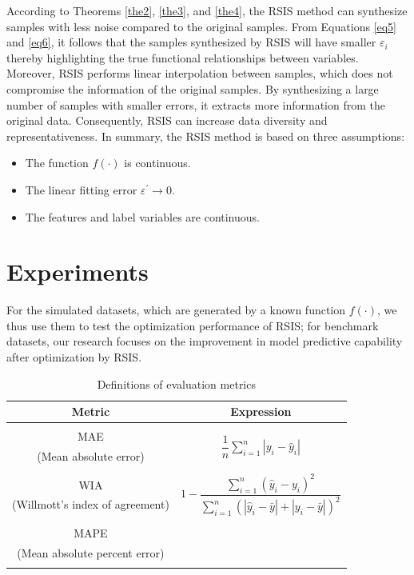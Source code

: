 \documentclass[final,3p,times]{elsarticle}
\begin{document}
{According to Theorems \ref{the2}, \ref{the3}, and \ref{the4}, the RSIS method can synthesize samples with less noise compared to the original samples. From Equations \eqref{eq5} and \eqref{eq6}, it follows that the samples synthesized by RSIS will have smaller $\varepsilon_i$ thereby highlighting the true functional relationships between variables. Moreover, RSIS performs linear interpolation between samples, which does not compromise the information of the original samples. By synthesizing a large number of samples with smaller errors, it extracts more information from the original data. Consequently, RSIS can increase data diversity and representativeness.}
In summary, the RSIS method is based on three assumptions:


\begin{itemize}
  \item The function $f(\cdot)$ is continuous.
  \item The linear fitting error $\varepsilon^\prime\rightarrow0$.
  \item The features and label variables are continuous.
\end{itemize}



\section{Experiments}
For the simulated datasets, which are generated by a known 
function $f(\cdot)$, we thus use them to test the optimization 
performance of RSIS; for benchmark datasets, our research focuses 
on the improvement in model predictive capability after 
optimization by RSIS.

\begin{table}[b!]
  \centering
  \begin{threeparttable}
  \caption{Definitions of evaluation metrics \label{tab1}}
  \begin{tabular}{cc}
  \toprule
  Metric & Expression \\
  \midrule
   & \multirow{4}{*}{$\dfrac{1}{n} \sum_{i=1}^{n} \left| y_i - \hat{y}_i \right|$} \\
  MAE & \\
  (Mean absolute error) & \\
   & \\
   & \multirow{4}{*}{$1 - \dfrac{\sum_{i=1}^{n}(\hat{y}_i - y_i)^2}{\sum_{i=1}^{n}(\left|\hat{y}_i - \bar{y}\right| + \left|y_i - \bar{y}\right|)^2}$} \\
  WIA & \\
  (Willmott's index of agreement) & \\
   & \\ 
   & {\multirow{4}{*}{$\dfrac{1}{n} \sum_{i=1}^{n} \left| \dfrac{y_i - \hat{y}_i}{y_i+0.01} \right|$}} \\
  MAPE & \\
  (Mean absolute percent error) & \\
  & \\
  \bottomrule
  \end{tabular}
\end{threeparttable}
\end{table}
\end{document}

